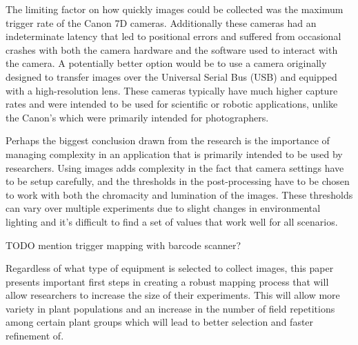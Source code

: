 The limiting factor on how quickly images could be collected was the maximum trigger rate of the Canon 7D cameras.  Additionally these cameras had an indeterminate latency that led to positional errors and suffered from occasional crashes with both the camera hardware and the software used to interact with the camera.  A potentially better option would be to use a camera originally designed to transfer images over the Universal Serial Bus (USB) and equipped with a high-resolution lens.  These cameras typically have much higher capture rates and were intended to be used for scientific or robotic applications, unlike the Canon's which were primarily intended for photographers. 

Perhaps the biggest conclusion drawn from the research is the importance of managing complexity in an application that is primarily intended to be used by researchers.  Using images adds complexity in the fact that camera settings have to be setup carefully, and the thresholds in the post-processing have to be chosen to work with both the chromacity and lumination of the images.  These thresholds can vary over multiple experiments due to slight changes in environmental lighting and it's difficult to find a set of values that work well for all scenarios.     

TODO mention trigger mapping with barcode scanner?

Regardless of what type of equipment is selected to collect images, this paper presents important first steps in creating a robust mapping process that will allow researchers to increase the size of their experiments. This will allow more variety in plant populations and an increase in the number of field repetitions among certain plant groups which will lead to better selection and faster refinement of.  
